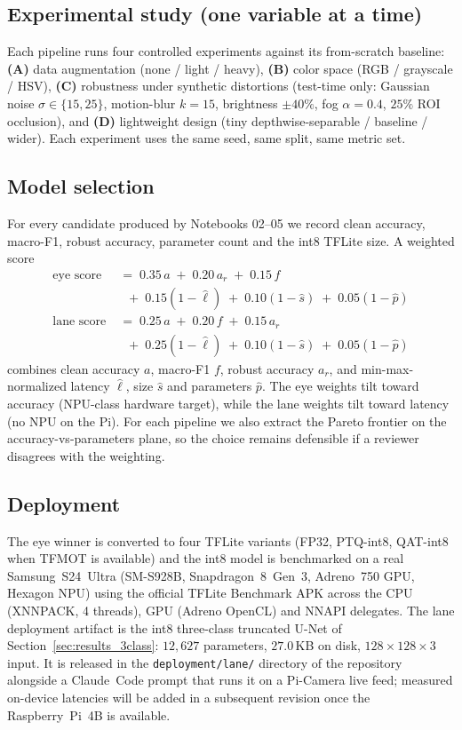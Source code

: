 \documentclass[conference]{IEEEtran}
\begin{document}
\subsection{Experimental study (one variable at a time)}
Each pipeline runs four controlled experiments against its
from-scratch baseline: \textbf{(A)} data augmentation
(none / light / heavy), \textbf{(B)} color space
(RGB / grayscale / HSV), \textbf{(C)} robustness under synthetic
distortions (test-time only: Gaussian noise $\sigma{\in}\{15,25\}$,
motion-blur $k{=}15$, brightness $\pm 40\%$, fog $\alpha{=}0.4$,
$25\%$ ROI occlusion), and \textbf{(D)} lightweight design
(tiny depthwise-separable / baseline / wider). Each experiment uses
the same seed, same split, same metric set.

\subsection{Model selection}
For every candidate produced by Notebooks 02--05 we record clean
accuracy, macro-F1, robust accuracy, parameter count and the int8
TFLite size. A weighted score
\begin{align}
\text{eye score}\;&=\;0.35\,a\;+\;0.20\,a_r\;+\;0.15\,f\nonumber\\
                  &\;\;+\;0.15(1-\hat\ell)\;+\;0.10(1-\hat s)\;+\;0.05(1-\hat p)\\
\text{lane score}\;&=\;0.25\,a\;+\;0.20\,f\;+\;0.15\,a_r\nonumber\\
                   &\;\;+\;0.25(1-\hat\ell)\;+\;0.10(1-\hat s)\;+\;0.05(1-\hat p)
\end{align}
combines clean accuracy $a$, macro-F1 $f$, robust accuracy $a_r$, and
min-max-normalized latency $\hat\ell$, size $\hat s$ and parameters
$\hat p$. The eye weights tilt toward accuracy (NPU-class hardware
target), while the lane weights tilt toward latency (no NPU on the
Pi). For each pipeline we also extract the Pareto frontier on the
accuracy-vs-parameters plane, so the choice remains defensible if a
reviewer disagrees with the weighting.

\subsection{Deployment}
The eye winner is converted to four TFLite variants (FP32, PTQ-int8,
QAT-int8 when TFMOT is available) and the int8 model is benchmarked
on a real Samsung~S24~Ultra (SM-S928B, Snapdragon~8~Gen~3, Adreno~750
GPU, Hexagon NPU) using the official TFLite Benchmark APK across the
CPU (XNNPACK, 4 threads), GPU (Adreno OpenCL) and NNAPI delegates.
The lane deployment artifact is the int8 three-class truncated U-Net
of Section~\ref{sec:results_3class}: $12{,}627$ parameters,
$27.0$\,KB on disk, $128\!\times\!128\!\times\!3$ input. It is
released in the \texttt{deployment/lane/} directory of the
repository alongside a Claude~Code prompt that runs it on a
Pi-Camera live feed; measured on-device latencies will be added
in a subsequent revision once the Raspberry~Pi~4B is available.
\end{document}
